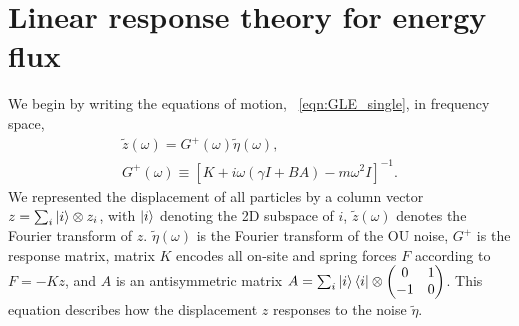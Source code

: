 \documentclass[
 preprint,
 preprintnumbers,
 amsmath,amssymb,
 aps,
 pre,
 longbibliography,
 superscriptaddress,
 10pt, twocolumn
]{revtex4-1}
\begin{document}
\section{Linear response theory for energy flux} \label{sec:linear_response}


We begin by writing the equations of motion, \eqnname~\eqref{eqn:GLE_single}, in frequency space,
\begin{gather} \label{eqn:response}
    \tilde{z}(\omega) = G^+(\omega) \tilde{\eta}(\omega), \\
    G^{+}(\omega) \equiv [K + i\omega(\gamma I + BA) - m\omega^2I]^{-1}.
\end{gather}
We represented the displacement of all particles by a column vector $z=\sum_i \ket{i}\otimes z_i$, with $\ket{i}$ denoting the 2D subspace of $i$, $\tilde{z}(\omega)$ denotes the Fourier transform of $z$. $\tilde{\eta}(\omega)$ is the Fourier transform of the OU noise, $G^+$ is the response matrix, matrix $K$ encodes all on-site and spring forces $F$ according to $F=-Kz$, and $A$ is an antisymmetric matrix $A=\sum_i \ket{i}\bra{i}\otimes \mqty(0 & 1 \\ -1 & 0)$. This equation describes how the displacement $z$ responses to the noise $\tilde{\eta}$.
\end{document}
